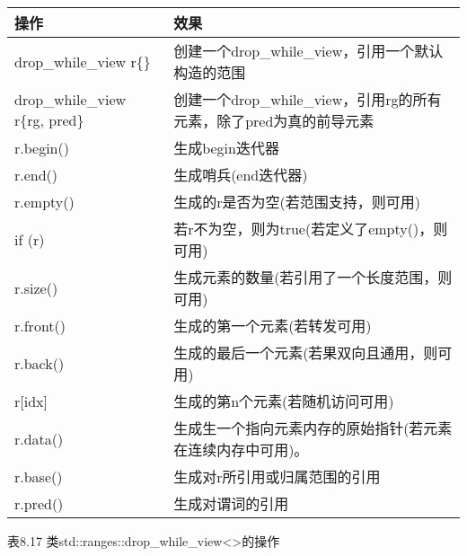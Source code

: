 \begin{longtable}[c]{|l|l|}
\hline
\textbf{操作} & \textbf{效果}                                                         \\ \hline
\endfirsthead
%
\endhead
%
drop\_while\_view r\{\}         & 创建一个drop\_while\_view，引用一个默认构造的范围                                           \\ \hline
drop\_while\_view r\{rg, pred\} & 创建一个drop\_while\_view，引用rg的所有元素，除了pred为真的前导元素 \\ \hline
r.begin()          & 生成begin迭代器                                               \\ \hline
r.end()            & 生成哨兵(end迭代器)                                       \\ \hline
r.empty()          & 生成的r是否为空(若范围支持，则可用)          \\ \hline
if (r)             & 若r不为空，则为true(若定义了empty()，则可用)                 \\ \hline
r.size()           & 生成元素的数量(若引用了一个长度范围，则可用) \\ \hline
r.front()          & 生成的第一个元素(若转发可用)                       \\ \hline
r.back()           & 生成的最后一个元素(若果双向且通用，则可用)          \\ \hline
r{[}idx{]}         & 生成的第n个元素(若随机访问可用)                     \\ \hline
r.data()           & 生成生一个指向元素内存的原始指针(若元素在连续内存中可用)。              \\ \hline
r.base()           & 生成对r所引用或归属范围的引用                \\ \hline
r.pred()           & 生成对谓词的引用                                     \\ \hline
\end{longtable}

\begin{center}
表8.17 类std::ranges::drop\_while\_view<>的操作
\end{center}


